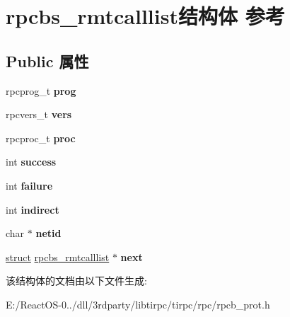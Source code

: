 \hypertarget{structrpcbs__rmtcalllist}{}\section{rpcbs\+\_\+rmtcalllist结构体 参考}
\label{structrpcbs__rmtcalllist}
\subsection*{Public 属性}
\begin{DoxyCompactItemize}
\item 
\mbox{\label{structrpcbs__rmtcalllist_ace1d7c097b0d9365396ccd11a857ac9c}} 
rpcprog\+\_\+t {\bfseries prog}
\item 
\mbox{\label{structrpcbs__rmtcalllist_af56c1fc44f30510cccb3b8ff75213f1f}} 
rpcvers\+\_\+t {\bfseries vers}
\item 
\mbox{\label{structrpcbs__rmtcalllist_a9dd0ada8224cf794462e7dd5fc8abc8a}} 
rpcproc\+\_\+t {\bfseries proc}
\item 
\mbox{\label{structrpcbs__rmtcalllist_a6918501bd3909ac409f40146ba7fb92e}} 
int {\bfseries success}
\item 
\mbox{\label{structrpcbs__rmtcalllist_a3e68f6708eb8382f5b1411fe4d5ffb79}} 
int {\bfseries failure}
\item 
\mbox{\label{structrpcbs__rmtcalllist_ade41863793ee9062b07cf089fd647cbe}} 
int {\bfseries indirect}
\item 
\mbox{\label{structrpcbs__rmtcalllist_a9ab1678ec6585f9942a0d37bc6eb9ea8}} 
char $\ast$ {\bfseries netid}
\item 
\mbox{\label{structrpcbs__rmtcalllist_aff1f0301561022959f916b83d5fb1c42}} 
\hyperlink{interfacestruct}{struct} \hyperlink{structrpcbs__rmtcalllist}{rpcbs\+\_\+rmtcalllist} $\ast$ {\bfseries next}
\end{DoxyCompactItemize}


该结构体的文档由以下文件生成\+:\begin{DoxyCompactItemize}
\item 
E\+:/\+React\+O\+S-\/0../dll/3rdparty/libtirpc/tirpc/rpc/rpcb\+\_\+prot.\+h\end{DoxyCompactItemize}
